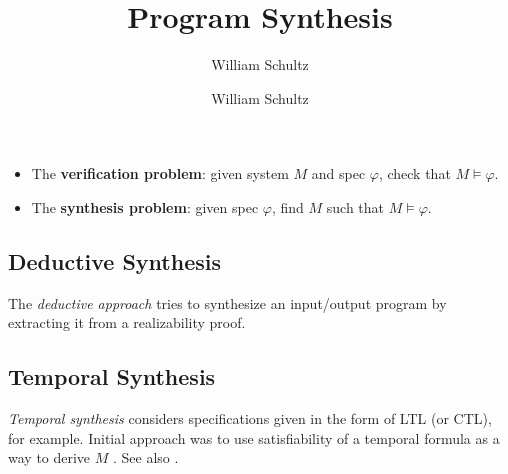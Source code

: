 \documentclass[10pt,a4paper]{article}
\author{William Schultz}
\begin{document}
\title{Program Synthesis}
\author{William Schultz}
\maketitle


\begin{itemize}
    \item The \textbf{verification problem}: given system $M$ and spec $\varphi$, check that $M \vDash \varphi$.
    \item The \textbf{synthesis problem}: given spec $\varphi$, find $M$ such that $M \vDash \varphi$.
\end{itemize}

\subsection*{Deductive Synthesis}

The \textit{deductive approach} \cite{manna1980deductive} tries to synthesize an input/output program by extracting it from a realizability proof.

\subsection*{Temporal Synthesis}

\textit{Temporal synthesis} considers specifications given in the form of LTL (or CTL), for example. Initial approach was to use satisfiability of a temporal formula as a way to derive $M$ \cite{1981clarkemerson}. 
See also \cite{1984mannawolper}. 
\end{document}
